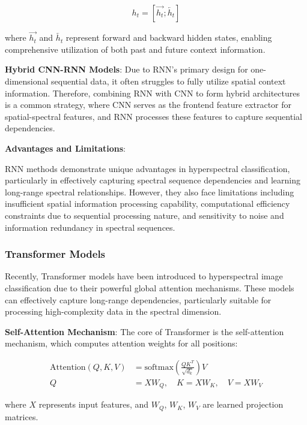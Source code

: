 \documentclass[journal]{IEEEtran}
\begin{document}
\begin{equation}
h_t = [\overrightarrow{h_t}; \overleftarrow{h_t}]
\end{equation}

where $\overrightarrow{h_t}$ and $\overleftarrow{h_t}$ represent forward and backward hidden states, enabling comprehensive utilization of both past and future context information.

\textbf{Hybrid CNN-RNN Models}: Due to RNN's primary design for one-dimensional sequential data, it often struggles to fully utilize spatial context information. Therefore, combining RNN with CNN to form hybrid architectures is a common strategy, where CNN serves as the frontend feature extractor for spatial-spectral features, and RNN processes these features to capture sequential dependencies.

\textbf{Advantages and Limitations}:

RNN methods demonstrate unique advantages in hyperspectral classification, particularly in effectively capturing spectral sequence dependencies and learning long-range spectral relationships. However, they also face limitations including insufficient spatial information processing capability, computational efficiency constraints due to sequential processing nature, and sensitivity to noise and information redundancy in spectral sequences.

\subsubsection{Transformer Models}

Recently, Transformer models have been introduced to hyperspectral image classification due to their powerful global attention mechanisms. These models can effectively capture long-range dependencies, particularly suitable for processing high-complexity data in the spectral dimension.

\textbf{Self-Attention Mechanism}: The core of Transformer is the self-attention mechanism, which computes attention weights for all positions:

\begin{align}
\text{Attention}(Q, K, V) &= \text{softmax}\left(\frac{QK^T}{\sqrt{d_k}}\right)V \\
Q &= XW_Q, \quad K = XW_K, \quad V = XW_V
\end{align}

where $X$ represents input features, and $W_Q$, $W_K$, $W_V$ are learned projection matrices.
\end{document}
